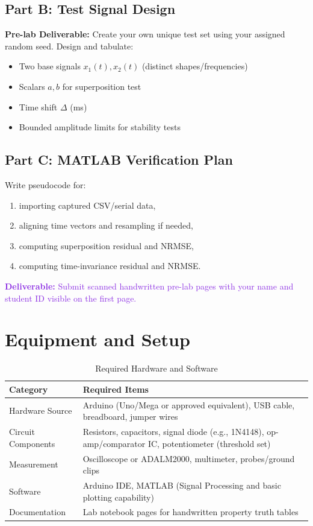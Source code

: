 \documentclass[11pt,letterpaper]{article}
\providecommand{\pldECE}[1]{\textcolor{BrickRed}{\textbf{Pre-lab Deliverable:} #1}}
\providecommand{\delECE}[1]{\textcolor{BlueViolet}{\textbf{Deliverable:} #1}}
\begin{document}
\subsection{Part B: Test Signal Design}
\pldECE{Create your own unique test set using your assigned random seed.}
Design and tabulate:
\begin{itemize}
    \item Two base signals $x_1(t),x_2(t)$ (distinct shapes/frequencies)
    \item Scalars $a,b$ for superposition test
    \item Time shift $\Delta$ (ms)
    \item Bounded amplitude limits for stability tests
\end{itemize}

\subsection{Part C: MATLAB Verification Plan}
Write pseudocode for:
\begin{enumerate}
    \item importing captured CSV/serial data,
    \item aligning time vectors and resampling if needed,
    \item computing superposition residual and NRMSE,
    \item computing time-invariance residual and NRMSE.
\end{enumerate}

\delECE{Submit scanned handwritten pre-lab pages with your name and student ID visible on the first page.}

\clearpage

\clearpage

\section{Equipment and Setup}
\begin{table}[H]
    \centering
    \caption{Required Hardware and Software}
    \begin{tabularx}{\linewidth}{l X}
    \toprule
    \textbf{Category} & \textbf{Required Items}\\
    \midrule
    Hardware Source & Arduino (Uno/Mega or approved equivalent), USB cable, breadboard, jumper wires\\
    Circuit Components & Resistors, capacitors, signal diode (e.g., 1N4148), op-amp/comparator IC, potentiometer (threshold set)\\
    Measurement & Oscilloscope or ADALM2000, multimeter, probes/ground clips\\
    Software & Arduino IDE, MATLAB (Signal Processing and basic plotting capability)\\
    Documentation & Lab notebook pages for handwritten property truth tables\\
    \bottomrule
    \end{tabularx}
\end{table}
\end{document}
